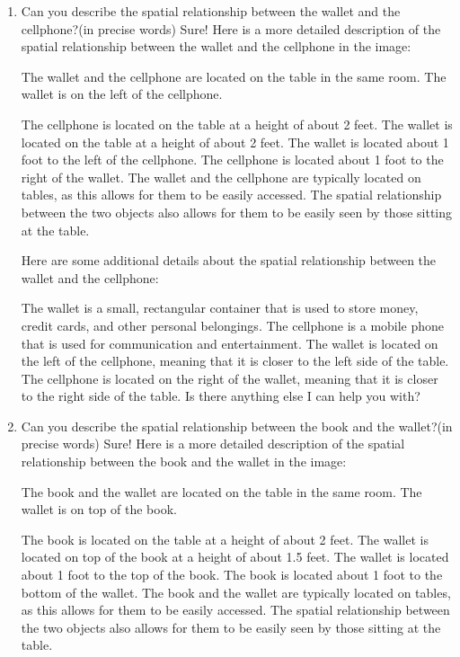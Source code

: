 \begin{enumerate}
    \item Can you describe the spatial relationship between the wallet and the cellphone?(in precise words)
    \subitem 
    Sure! Here is a more detailed description of the spatial relationship between the wallet and the cellphone in the image:
    
    The wallet and the cellphone are located on the table in the same room. The wallet is on the left of the cellphone.
    
    The cellphone is located on the table at a height of about 2 feet.
    The wallet is located on the table at a height of about 2 feet.
    The wallet is located about 1 foot to the left of the cellphone.
    The cellphone is located about 1 foot to the right of the wallet.
    The wallet and the cellphone are typically located on tables, as this allows for them to be easily accessed. The spatial relationship between the two objects also allows for them to be easily seen by those sitting at the table.
    
    Here are some additional details about the spatial relationship between the wallet and the cellphone:
    
    The wallet is a small, rectangular container that is used to store money, credit cards, and other personal belongings.
    The cellphone is a mobile phone that is used for communication and entertainment.
    The wallet is located on the left of the cellphone, meaning that it is closer to the left side of the table.
    The cellphone is located on the right of the wallet, meaning that it is closer to the right side of the table.
    Is there anything else I can help you with?
    \item Can you describe the spatial relationship between the book and the wallet?(in precise words)
    \subitem 
    Sure! Here is a more detailed description of the spatial relationship between the book and the wallet in the image:
    
    The book and the wallet are located on the table in the same room. The wallet is on top of the book.
    
    The book is located on the table at a height of about 2 feet.
    The wallet is located on top of the book at a height of about 1.5 feet.
    The wallet is located about 1 foot to the top of the book.
    The book is located about 1 foot to the bottom of the wallet.
    The book and the wallet are typically located on tables, as this allows for them to be easily accessed. The spatial relationship between the two objects also allows for them to be easily seen by those sitting at the table.
    

\end{enumerate}
